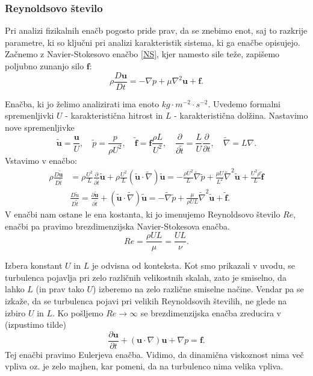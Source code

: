 \documentclass[mat2, tisk]{fmfdelo}
\newcommand{\bd}{\textbf}
\begin{document}
\subsubsection{Reynoldsovo število}
Pri analizi fizikalnih enačb pogosto pride prav, da se znebimo enot, saj to razkrije 
parametre, ki so ključni pri analizi karakteristik sistema, ki ga enačbe opisujejo. 
Začnemo z Navier-Stokesovo enačbo \eqref{NS}, kjer namesto sile teže, zapišemo 
poljubno zunanjo silo $\bd{f}$:
$$
\rho \frac{D \bd{u}}{D t} = - \nabla p + \mu \nabla^2 \bd{u} + \bd{f}.
$$

Enačba, ki jo želimo analizirati ima enoto $kg \cdot m^{-2}\cdot s^{-2}$. Uvedemo formalni 
spremenljivki $U$ - karakteristična hitrost in $L$ - karakteristična dolžina. Nastavimo
nove spremenljivke 
$$
\tilde{\bd{u}} = \frac{\bd{u}}{U}, \quad \tilde{p} = \frac{p}{\rho U^2}, \quad \tilde{\bd{f}} = \bd{f}\frac{\rho L}{U^2},
\quad \frac{\partial}{\partial \tilde{t}} = \frac{L}{U} \frac{\partial}{\partial t}, \quad 
\tilde{\nabla} = L\nabla.
$$
Vstavimo v enačbo:
\begin{align*}
\rho \frac{D\tilde{\bd{u}}}{D \tilde{t}} &= \rho \frac{U^2}{L} \frac{\partial}{\partial \tilde{t}} \tilde{\bd{u}} + 
\rho \frac{U^2}{L} (\tilde{\bd{u}} \cdot \tilde{\nabla}) \tilde{\bd{u}} = - \frac{\rho U^2}{L} \tilde{\nabla} \tilde{p}
+ \frac{\mu U}{L^2} \tilde{\nabla}^2 \tilde{\bd{u}} + \frac{U^2 \rho}{L}\tilde{\bd{f}} \\[2mm]
&\frac{D\tilde{u}}{D \tilde{t}} = \frac{\partial \tilde{\bd{u}}}{\partial \tilde{t}} + 
(\tilde{\bd{u}} \cdot \tilde{\nabla}) \tilde{\bd{u}} = - \tilde{\nabla} \tilde{p}
+ \frac{\mu}{\rho UL} \tilde{\nabla}^2 \tilde{\bd{u}} + \tilde{\bd{f}}.
\end{align*}
V enačbi nam ostane le ena kostanta, ki jo imenujemo Reynoldsovo število $Re$, enačbi pa pravimo brezdimenzijska Navier-Stokesova enačba.
\begin{equation}
Re = \frac{\rho UL}{\mu} = \frac{UL}{\nu}.
\end{equation}

Izbera konstant $U$ in $L$ je odvisna od konteksta. Kot smo prikazali v uvodu, 
se turbulenca pojavlja pri zelo različnih velikostnih skalah, zato je smiselno, da 
lahko $L$ (in prav tako $U$) izberemo na zelo različne smiselne načine. Vendar pa se izkaže, da se 
turbulenca pojavi pri velikih Reynoldsovih številih, ne glede na izbiro $U$ in $L$.
Ko pošljemo $Re \rightarrow \infty$ se brezdimenzijska enačba zreducira v (izpustimo tilde)
\begin{equation}
\label{Euler NS}
\frac{\partial \bd{u}}{\partial t} + (\bd{u}\cdot \nabla)\bd{u} + \nabla p = \bd{f}.
\end{equation}
Tej enačbi pravimo Eulerjeva enačba. Vidimo, da dinamična viskoznost nima več vpliva
oz. je zelo majhen, kar pomeni, da na turbulenco nima velika vpliva. \\
\end{document}
